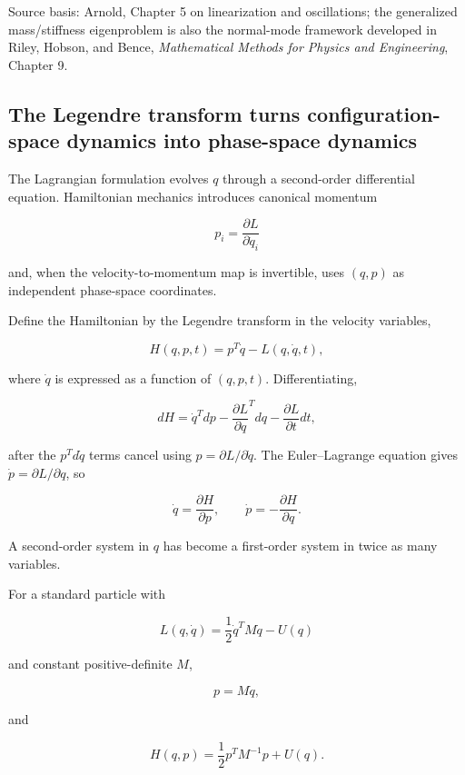 Source basis: Arnold, Chapter 5 on linearization and oscillations; the generalized mass/stiffness eigenproblem is also the normal-mode framework developed in Riley, Hobson, and Bence, \emph{Mathematical Methods for Physics and Engineering}, Chapter 9.

\subsection{The Legendre transform turns configuration-space dynamics into phase-space dynamics}\label{02-foundations-ii-ch039-the-legendre-transform-turns-configuration-space-dynamics-into-phase-space-dynamics}

\hypertarget{02-foundations-ii-ch039-the-legendre-transform-turns-configuration-space-dynamics-into-phase-space-dynamics}{}

The Lagrangian formulation evolves \(q\) through a second-order differential equation. Hamiltonian mechanics introduces canonical momentum

\[
p_i
=
\frac{\partial L}{\partial\dot q_i}
\]

and, when the velocity-to-momentum map is invertible, uses \((q,p)\) as independent phase-space coordinates.

Define the Hamiltonian by the Legendre transform in the velocity variables,

\[
H(q,p,t)
=
p^T\dot q-L(q,\dot q,t),
\]

where \(\dot q\) is expressed as a function of \((q,p,t)\). Differentiating,

\[
dH
=
\dot q^Tdp
-
\frac{\partial L}{\partial q}^Tdq
-
\frac{\partial L}{\partial t}dt,
\]

after the \(p^Td\dot q\) terms cancel using \(p=\partial L/\partial\dot q\). The Euler--Lagrange equation gives \(\dot p=\partial L/\partial q\), so

\[
\boxed{
\dot q=
\frac{\partial H}{\partial p},
\qquad
\dot p=
-\frac{\partial H}{\partial q}.
}
\]

A second-order system in \(q\) has become a first-order system in twice as many variables.

For a standard particle with

\[
L(q,\dot q)
=
\frac12\dot q^TM\dot q-U(q)
\]

and constant positive-definite \(M\),

\[
p=M\dot q,
\]

and

\[
H(q,p)
=
\frac12p^TM^{-1}p+U(q).
\]

